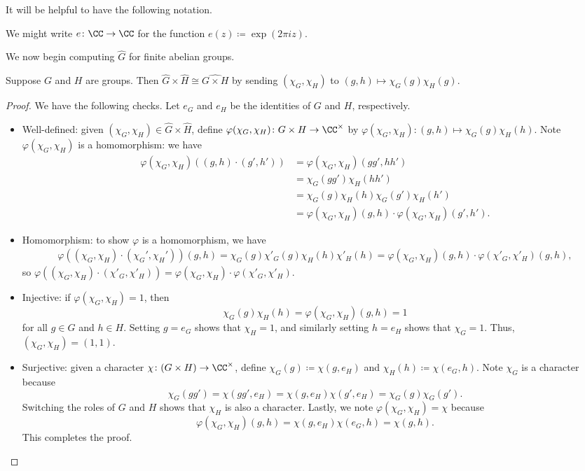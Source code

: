 \documentclass[../notes.tex]{subfiles}
\begin{document}
It will be helpful to have the following notation.
\begin{notation}
	We might write $e\colon\CC\to\CC$ for the function $e(z)\coloneqq\exp(2\pi iz)$.
\end{notation}
We now begin computing $\widehat{G}$ for finite abelian groups.
\begin{lemma} \label{lem:prod-dual}
	Suppose $G$ and $H$ are groups. Then $\widehat{G}\times \widehat{H}\cong\widehat{G\times H}$ by sending $(\chi_G,\chi_H)$ to $(g,h)\mapsto\chi_G(g)\chi_H(g)$.
\end{lemma}
\begin{proof}
	We have the following checks. Let $e_G$ and $e_H$ be the identities of $G$ and $H$, respectively.
	\begin{itemize}
		\item Well-defined: given $(\chi_G,\chi_H)\in \widehat{G}\times \widehat{H}$, define $\varphi(\chi_G,\chi_H)\colon G\times H\to\CC^\times$ by $\varphi(\chi_G,\chi_H)\colon(g,h)\mapsto\chi_G(g)\chi_H(h)$. Note $\varphi(\chi_G,\chi_H)$ is a homomorphism: we have
		\begin{align*}
			\varphi(\chi_G,\chi_H)((g,h)\cdot(g',h')) &= \varphi(\chi_G,\chi_H)(gg',hh') \\
			&= \chi_G(gg')\chi_H(hh') \\
			&= \chi_G(g)\chi_H(h)\chi_G(g')\chi_H(h') \\
			&=\varphi(\chi_G,\chi_H)(g,h)\cdot\varphi(\chi_G,\chi_H)(g',h').
		\end{align*}
		\item Homomorphism: to show $\varphi$ is a homomorphism, we have
		\begin{align*}
			\varphi((\chi_G,\chi_H)\cdot(\chi_G',\chi_H'))(g,h)=\chi_G(g)\chi'_G(g)\chi_H(h)\chi'_H(h)=\varphi(\chi_G,\chi_H)(g,h)\cdot\varphi(\chi'_G,\chi'_H)(g,h),
		\end{align*}
		so $\varphi((\chi_G,\chi_H)\cdot(\chi'_G,\chi'_H))=\varphi(\chi_G,\chi_H)\cdot\varphi(\chi'_G,\chi'_H)$.
		\item Injective: if $\varphi(\chi_G,\chi_H)=1$, then
		\[\chi_G(g)\chi_H(h)=\varphi(\chi_G,\chi_H)(g,h)=1\]
		for all $g\in G$ and $h\in H$. Setting $g=e_G$ shows that $\chi_H=1$, and similarly setting $h=e_H$ shows that $\chi_G=1$. Thus, $(\chi_G,\chi_H)=(1,1)$.
		\item Surjective: given a character $\chi\colon(G\times H)\to\CC^\times$, define $\chi_G(g)\coloneqq\chi(g,e_H)$ and $\chi_H(h)\coloneqq\chi(e_G,h)$. Note $\chi_G$ is a character because
		\[\chi_G(gg')=\chi(gg',e_H)=\chi(g,e_H)\chi(g',e_H)=\chi_G(g)\chi_G(g').\]
		Switching the roles of $G$ and $H$ shows that $\chi_H$ is also a character. Lastly, we note $\varphi(\chi_G,\chi_H)=\chi$ because
		\[\varphi(\chi_G,\chi_H)(g,h)=\chi(g,e_H)\chi(e_G,h)=\chi(g,h).\]
		This completes the proof.
		\qedhere
	\end{itemize}
\end{proof}
\end{document}
